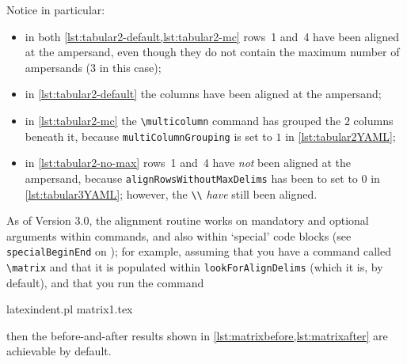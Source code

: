 	\begin{widepage}
	\end{widepage}

	Notice in particular:
	\begin{itemize}
		\item in both \cref{lst:tabular2-default,lst:tabular2-mc} rows~1 and~4 have been aligned at the ampersand, even
		      though they do not contain the maximum number of ampersands (3 in this case);
		\item in \cref{lst:tabular2-default} the columns have been aligned at the ampersand;
		\item in \cref{lst:tabular2-mc} the \lstinline!\multicolumn! command has grouped the $2$ columns beneath it,
		      because \texttt{multiColumnGrouping} is set to $1$ in \cref{lst:tabular2YAML};
		\item in \cref{lst:tabular2-no-max} rows~1 and~4 have \emph{not} been aligned at the ampersand, because
		      \texttt{alignRowsWithoutMaxDelims} has been to set to $0$ in \cref{lst:tabular3YAML}; however, 
              the \lstinline!\\! \emph{have} still been aligned.
	\end{itemize}

	As of Version 3.0, the alignment routine works on mandatory and optional arguments within commands, and also within `special' code blocks
	(see \texttt{specialBeginEnd} on ); for example, assuming that you have a command called \lstinline!\matrix!
	and that it is populated within \texttt{lookForAlignDelims} (which it is, by default), and that you
	run the command
	\begin{commandshell}
latexindent.pl matrix1.tex 
    \end{commandshell}
	then the before-and-after results
	shown in \cref{lst:matrixbefore,lst:matrixafter} are achievable by default.

	\begin{minipage}{.45\textwidth}
	\end{minipage}%
	\hfill
	\begin{minipage}{.45\textwidth}
	\end{minipage}%

